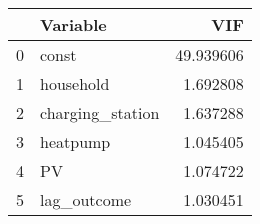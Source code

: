 \begin{tabular}{llr}
\toprule
 & Variable & VIF \\
\midrule
0 & const & 49.939606 \\
1 & household & 1.692808 \\
2 & charging_station & 1.637288 \\
3 & heatpump & 1.045405 \\
4 & PV & 1.074722 \\
5 & lag_outcome & 1.030451 \\
\bottomrule
\end{tabular}
